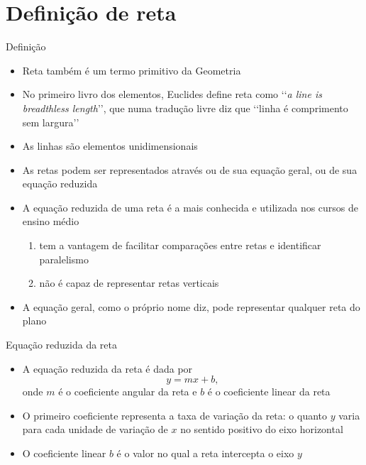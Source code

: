 \section{Definição de reta}

\begin{frame}[fragile]{Definição}

    \begin{itemize}
        \item Reta também é um termo primitivo da Geometria
        \pause

        \item No primeiro livro dos elementos, Euclides define reta como 
            \lq\lq \textit{a line is breadthless length}\rq\rq, que numa tradução livre 
            diz que \lq\lq linha é comprimento sem largura\rq\rq
        \pause

        \item As linhas são elementos unidimensionais
        \pause

        \item As retas podem ser representados através ou de sua equação geral, ou de
            sua equação reduzida
        \pause

        \item  A equação reduzida de uma reta é a mais conhecida e utilizada nos cursos de ensino médio
        \pause
        \begin{enumerate}
            \item tem a vantagem de facilitar comparações entre retas e identificar paralelismo
            \pause 
            \item não é capaz de representar retas verticais
        \end{enumerate}
        \pause

        \item A equação geral, como o próprio nome diz, pode representar qualquer reta do plano
   \end{itemize}

\end{frame}

\begin{frame}[fragile]{Equação reduzida da reta}

    \begin{itemize}
        \item A equação reduzida da reta é dada por
        \[
            y = mx + b,
        \]
        onde $m$ é o coeficiente angular da reta e $b$ é o coeficiente linear da reta
        \pause

        \item O primeiro coeficiente representa a taxa de variação da reta: o quanto
        $y$ varia para cada unidade de variação de $x$ no sentido positivo do eixo horizontal
        \pause

        \item O coeficiente linear $b$ é o valor no qual a reta intercepta o eixo $y$
        \pause


    \end{itemize}

\end{frame}

